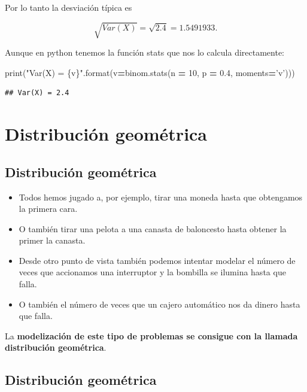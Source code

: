 \documentclass[]{book}
\newenvironment{Shaded}{\begin{snugshade}}{\end{snugshade}}
\newcommand{\BuiltInTok}[1]{#1}
\newcommand{\DecValTok}[1]{\textcolor[rgb]{0.00,0.00,0.81}{#1}}
\newcommand{\FloatTok}[1]{\textcolor[rgb]{0.00,0.00,0.81}{#1}}
\newcommand{\NormalTok}[1]{#1}
\newcommand{\OperatorTok}[1]{\textcolor[rgb]{0.81,0.36,0.00}{\textbf{#1}}}
\newcommand{\SpecialCharTok}[1]{\textcolor[rgb]{0.00,0.00,0.00}{#1}}
\newcommand{\StringTok}[1]{\textcolor[rgb]{0.31,0.60,0.02}{#1}}
\begin{document}
Por lo tanto la desviación típica es

\[\sqrt{Var(X)}=\sqrt{2.4}= 1.5491933.\]

Aunque en python tenemos la función stats que nos lo calcula directamente:

\begin{Shaded}
\begin{Highlighting}[]
\BuiltInTok{print}\NormalTok{(}\StringTok{"Var(X) = }\SpecialCharTok{\{v\}}\StringTok{"}\NormalTok{.}\BuiltInTok{format}\NormalTok{(v}\OperatorTok{=}\NormalTok{binom.stats(n }\OperatorTok{=} \DecValTok{10}\NormalTok{, p }\OperatorTok{=} \FloatTok{0.4}\NormalTok{, moments}\OperatorTok{=}\StringTok{'v'}\NormalTok{)))}
\end{Highlighting}
\end{Shaded}

\begin{verbatim}
## Var(X) = 2.4
\end{verbatim}

\hypertarget{distribuciuxf3n-geomuxe9trica}{%
\section{Distribución geométrica}\label{distribuciuxf3n-geomuxe9trica}}

\hypertarget{distribuciuxf3n-geomuxe9trica-1}{%
\subsection{Distribución geométrica}\label{distribuciuxf3n-geomuxe9trica-1}}

\begin{itemize}
\item
  Todos hemos jugado a, por ejemplo, tirar una moneda hasta que obtengamos la primera cara.
\item
  O también tirar una pelota a una canasta de baloncesto hasta obtener la primer la canasta.
\item
  Desde otro punto de vista también podemos intentar modelar el número de veces que accionamos una interruptor y la bombilla se ilumina hasta que falla.
\item
  O también el número de veces que un cajero automático nos da dinero hasta que falla.
\end{itemize}

La \textbf{modelización de este tipo de problemas se consigue con la llamada distribución geométrica}.

\hypertarget{distribuciuxf3n-geomuxe9trica-2}{%
\subsection{Distribución geométrica}\label{distribuciuxf3n-geomuxe9trica-2}}
\end{document}
